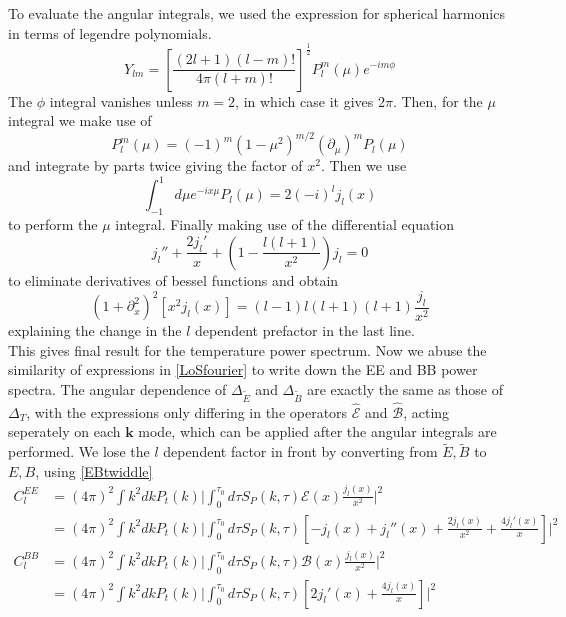 \documentclass[a4paper,10pt]{article}
\renewcommand{\v}[1]{\mathbf{#1}}
\newcommand{\half}{\frac{1}{2}}
\begin{document}
To evaluate the angular integrals, we used the expression for spherical harmonics in terms of legendre polynomials.
\begin{equation}
Y_{lm} = [\frac{(2l+1)(l-m)!}{4\pi(l+m)!}]^\half P_l^m(\mu)e^{-im\phi}
\end{equation}
The $\phi$ integral vanishes unless $m=2$, in which case it gives $2\pi$. Then, for the $\mu$ integral we make use of 
\begin{equation}
P^m_l(\mu)=(-1)^m(1-\mu^2)^{m/2}(\partial_\mu)^mP_l(\mu)
\end{equation}
and integrate by parts twice giving the factor of $x^2$. Then we use 
\begin{equation}
\int_{-1}^1 d\mu e^{-ix\mu}P_l(\mu) = 2(-i)^lj_l(x)
\end{equation}
to perform the $\mu$ integral. Finally making use of the differential equation
\begin{equation}
j_l''+\frac{2j_l'}{x}+(1-\frac{l(l+1)}{x^2})j_l=0
\end{equation}
to eliminate derivatives of bessel functions and obtain
\begin{equation}
(1+\partial_x^2)^2[x^2j_l(x)] = (l-1)l(l+1)(l+1)\frac{j_l}{x^2}
\end{equation}
explaining the change in the $l$ dependent prefactor in the last line.\\

This gives final result for the temperature power spectrum. Now we abuse the similarity of expressions in \ref{LoSfourier} to write down the EE and BB power spectra. The angular dependence of $\Delta_{\tilde{E}}$ and $\Delta_{\tilde{B}}$ are exactly the same as those of $\Delta_T$, with the expressions only differing in the operators $\hat{\mathcal{E}}$ and $\hat{\mathcal{B}}$, acting seperately on each $\v{k}$ mode, which can be applied after the angular integrals are performed. We lose the $l$ dependent factor in front by converting from $\tilde{E}, \tilde{B}$ to $E,B$, using \ref{EBtwiddle}
\begin{equation}\begin{split}
C_l^{EE} &= (4\pi)^2 \int k^2 dk P_t(k) \bigg|  \int_0^{\tau_0}d\tau  S_P(k,\tau)\mathcal{E}(x)\frac{j_l(x)}{x^2} \bigg|^2\\
&= (4\pi)^2\int k^2 dk P_t(k) \bigg|  \int_0^{\tau_0}d\tau  S_P(k,\tau)[-j_l(x) +j_l''(x)+\frac{2j_l(x)}{x^2} + \frac{4j_l'(x)}{x}]\bigg|^2\\
C_l^{BB} &= (4\pi)^2 \int k^2 dk P_t(k) \bigg|  \int_0^{\tau_0}d\tau  S_P(k,\tau)\mathcal{B}(x)\frac{j_l(x)}{x^2} \bigg|^2\\
&= (4\pi)^2\int k^2 dk P_t(k) \bigg|  \int_0^{\tau_0} d\tau S_P(k,\tau)[2j_l'(x)+\frac{4j_l(x)}{x}]\bigg|^2
\label{primordialBmodes}
\end{split}\end{equation}
\end{document}
